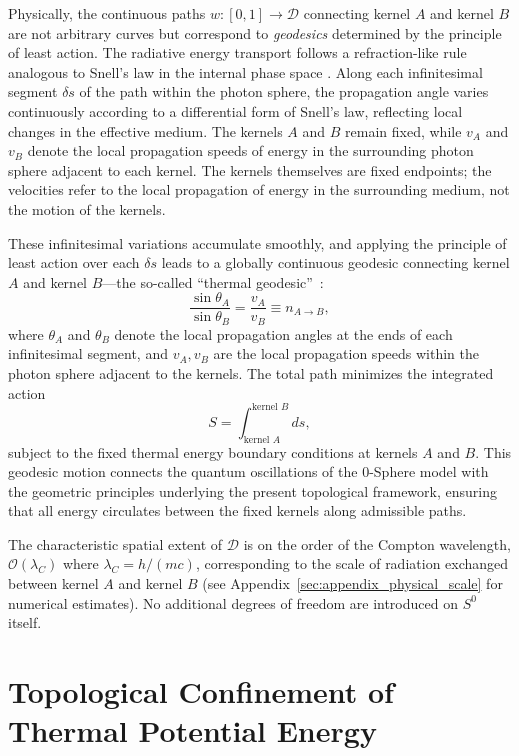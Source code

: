 \documentclass[%
 reprint,
 amsmath,amssymb,
 aps,
 prb,
]{revtex4-2}
\numberwithin{equation}{section}
\begin{document}
Physically, the continuous paths $w : [0,1] \rightarrow \mathcal{D}$ connecting kernel $A$ and kernel $B$ are not arbitrary curves but correspond to \textit{geodesics} determined by the principle of least action.
The radiative energy transport follows a refraction-like rule analogous to Snell's law in the internal phase space \cite{hanamura17765336}.
Along each infinitesimal segment $\delta s$ of the path within the photon sphere, the propagation angle varies continuously according to a differential form of Snell's law, reflecting local changes in the effective medium.
The kernels $A$ and $B$ remain fixed, while $v_A$ and $v_B$ denote the local propagation speeds of energy in the surrounding photon sphere adjacent to each kernel. The kernels themselves are fixed endpoints; the velocities refer to the local propagation of energy in the surrounding medium, not the motion of the kernels.

These infinitesimal variations accumulate smoothly, and applying the principle of least action over each $\delta s$ leads to a globally continuous geodesic connecting kernel $A$ and kernel $B$—the so-called ``thermal geodesic''~\cite{hanamura17765349}:
\begin{equation}
\frac{\sin \theta_A}{\sin \theta_B} = \frac{v_A}{v_B} \equiv n_{A \to B},
\end{equation}
where $\theta_A$ and $\theta_B$ denote the local propagation angles at the ends of each infinitesimal segment, and $v_A, v_B$ are the local propagation speeds within the photon sphere adjacent to the kernels.
The total path minimizes the integrated action
\begin{equation}
S = \int_{\text{kernel }A}^{\text{kernel }B} ds,
\end{equation}
subject to the fixed thermal energy boundary conditions at kernels $A$ and $B$.
This geodesic motion connects the quantum oscillations of the 0-Sphere model with the geometric principles underlying the present topological framework, ensuring that all energy circulates between the fixed kernels along admissible paths.


The characteristic spatial extent of $\mathcal{D}$ is on the order of the Compton wavelength, $\mathcal{O}(\lambda_C)$ where $\lambda_C = h/(mc)$, corresponding to the scale of radiation exchanged between kernel $A$ and kernel $B$ (see Appendix~\ref{sec:appendix_physical_scale} for numerical estimates).
No additional degrees of freedom are introduced on $S^{0}$ itself.

\section{Topological Confinement of Thermal Potential Energy}
\label{sec:confinement}
\end{document}
